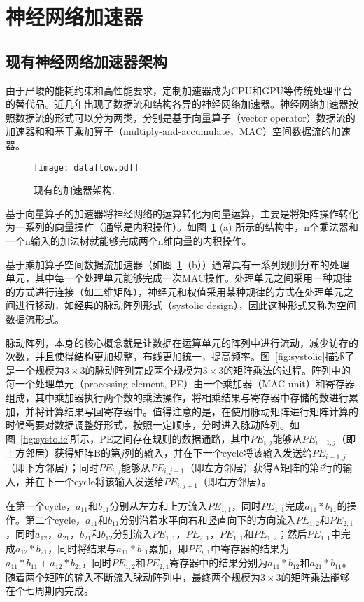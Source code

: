 \section{神经网络加速器}


\subsection{现有神经网络加速器架构}
由于严峻的能耗约束和高性能要求，定制加速器成为CPU和GPU等传统处理平台的替代品。近几年出现了数据流和结构各异的神经网络加速器。神经网络加速器按照数据流的形式可以分为两类，分别是基于向量算子（vector operator）数据流的加速器和和基于乘加算子（multiply-and-accumulate，MAC）空间数据流的加速器。

\begin{figure}[h]
  \centering
  \texttt{[image: dataflow.pdf]}
  \caption{\footnotesize 现有的加速器架构.}
  \label{fig:dataflow}
\end{figure}

基于向量算子的加速器将神经网络的运算转化为向量运算，主要是将矩阵操作转化为一系列的向量操作（通常是内积操作）。如图~\ref{fig:dataflow} (a) 所示的结构中，n个乘法器和一个n输入的加法树就能够完成两个n维向量的内积操作。

基于乘加算子空间数据流加速器（如图~\ref{fig:dataflow}（b））通常具有一系列规则分布的处理单元，其中每一个处理单元能够完成一次MAC操作。处理单元之间采用一种规律的方式进行连接（如二维矩阵），神经元和权值采用某种规律的方式在处理单元之间进行移动，如经典的脉动阵列形式（systolic design），因此这种形式又称为空间数据流形式。

脉动阵列，本身的核心概念就是让数据在运算单元的阵列中进行流动，减少访存的次数，并且使得结构更加规整，布线更加统一，提高频率。图~\ref{fig:systolic}描述了是一个规模为$3\times 3$的脉动阵列完成两个规模为$3\times 3$的矩阵乘法的过程。阵列中的每一个处理单元（processing element, PE）由一个乘加器（MAC unit）和寄存器组成，其中乘加器执行两个数的乘法操作，将相乘结果与寄存器中存储的数进行累加，并将计算结果写回寄存器中。值得注意的是，在使用脉动矩阵进行矩阵计算的时候需要对数据调整好形式，按照一定顺序，分时进入脉动阵列。如图~\ref{fig:systolic}所示，PE之间存在规则的数据通路，其中$PE_{i,j}$能够从$PE_{i-1,j}$（即上方邻居）获得矩阵B的第$j$列的输入，并在下一个cycle将该输入发送给$PE_{i+1,j}$（即下方邻居）；同时$PE_{i,j}$能够从$PE_{i,j-1}$（即左方邻居）获得A矩阵的第$i$行的输入，并在下一个cycle将该输入发送给$PE_{i,j+1}$（即右方邻居）。

在第一个cycle，$a_{11}$和$b_{11}$分别从左方和上方流入$PE_{1,1}$，同时$PE_{1,1}$完成$a_{11}*b_{11}$的操作。第二个cycle，$a_{11}$和$b_{11}$分别沿着水平向右和竖直向下的方向流入$PE_{1,2}$和$PE_{2,1}$，同时$a_{12}$，$a_{21}$，$b_{21}$和$b_{12}$分别流入$PE_{1,1}$，$PE_{2,1}$，$PE_{1,1}$和$PE_{1,2}$；然后$PE_{1,1}$中完成$a_{12}*b_{21}$，同时将结果与$a_{11}*b_{11}$累加，即$PE_{i,1}$中寄存器的结果为$a_{11}*b_{11}+a_{12}*b_{21}$，同时$PE_{1,2}$和$PE_{2,1}$寄存器中的结果分别为$a_{11}*b_{12}$和$a_{21}*b_{11}$。随着两个矩阵的输入不断流入脉动阵列中，最终两个规模为$3\times 3$的矩阵乘法能够在个七周期内完成。

